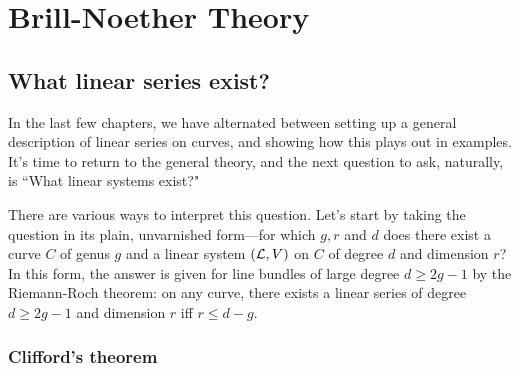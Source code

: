 
%
%
%
%
%
%

\chapter{Brill-Noether Theory}\label{Brill-Noether}



\section{What linear series exist?}

In the last few chapters, we have alternated between setting up a general description of linear series on curves, and showing how this plays out in examples. It's time to return to the general theory, and the next question to ask, naturally, is ``What linear systems exist?"

There are various ways to interpret this question. Let's start by taking the question in its plain, unvarnished form---for which $g, r$ and $d$ does there exist a curve $C$ of genus $g$ and a linear system $({\mathcal L},V)$ on $C$ of degree $d$ and dimension $r$? In this form, the answer is given for line bundles of large degree $d \geq 2g-1$ by the Riemann-Roch theorem: on any curve, there exists a linear series of degree $d \geq 2g-1$ and dimension $r$ iff $r \leq d-g$. 

\subsection{Clifford's theorem} 

